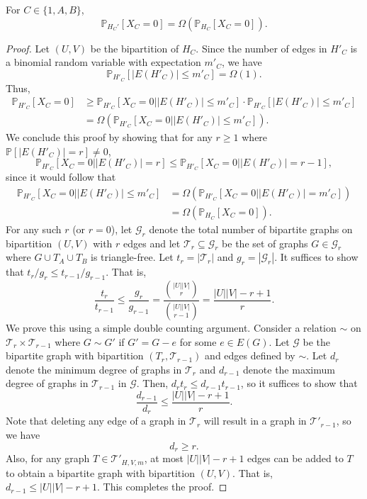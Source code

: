 \documentclass[10pt,a4paper]{amsart}
\def\P{\mathbb P}
\begin{document}
\begin{claim}\label{clm: m to p}
    For $C \in \{1,A,B\}$,
    \[
    \P_{H_C'}[X_C = 0] =\Omega(\P_{H_C}[X_C = 0]).
    \]
\end{claim}

\begin{proof}
    Let $(U,V)$ be the bipartition of $H_C$. Since the number of edges in $H'_C$ is a binomial random variable with expectation $m'_C$, we have 
    \[
    \P_{H'_C}[|E(H'_C)|\leq m'_C] = \Omega(1).
    \] 
    Thus, 
    \begin{align*}
        \P_{H'_C}[X_C = 0] &\geq \P_{H'_C}[X_C = 0 \mathrel ||E(H'_C)| \leq m'_C] \cdot\P_{H'_C}[|E(H'_C)| \leq m'_C]\\
        &= \Omega(\P_{H'_C}[X_C = 0 \mathrel ||E(H'_C)| \leq m'_C]).
    \end{align*}
We conclude this proof by showing that for any $r \geq 1$ where $\P[|E(H'_C)| = r] \neq 0$, 
    \[
        \P_{H'_C}[X_C = 0 \mathrel | |E(H'_C)| = r] \leq \P_{H'_C}[X_C = 0 \mathrel||E(H'_C)| = r-1],
    \]
    since it would follow that 
    \begin{align*}
        \P_{H'_C}[X_C = 0\mathrel | |E(H'_C)| \leq m'_C] &= \Omega(\P_{H'_C}[X_C = 0\mathrel | |E(H'_C)| = m'_C])\\
        &= \Omega(\P_{H_C}[X_C = 0]).
    \end{align*}
    For any such $r$ (or $r = 0$), let $\mathcal G_r$ denote the total number of bipartite graphs on bipartition $(U,V)$ with $r$ edges and let $\mathcal T_r \subseteq \mathcal G_r$ be the set of graphs $G \in \mathcal G_r$ where $G \cup T_A \cup T_B$ is triangle-free. Let $t_r = |\mathcal T_r|$ and $g_r = |\mathcal G_r|$. It suffices to show that $t_r/g_r \leq t_{r-1}/g_{r-1}$. That is,
    \[
    \frac{t_{r}}{t_{r-1}} \leq \frac{g_{r}}{g_{r-1}} = \frac{\binom{|U||V|}{r}}{\binom{|U||V|}{r-1}} = \frac{|U||V| - r + 1}{r}.
    \]
    We prove this using a simple double counting argument. Consider a relation $\sim $ on $\mathcal T_r \times \mathcal T_{r-1}$ where $G \sim G'$ if $G' = G -e$ for some $e \in E(G)$. Let $\mathscr G$ be the bipartite graph with bipartition $(T_{r} , \mathcal T_{r-1})$ and edges defined by $\sim$. Let $d_r$ denote the minimum degree of graphs in $\mathcal T_{r}$ and $d_{r-1}$ denote the maximum degree of graphs in $\mathcal T_{r-1}$ in $\mathscr G$. Then, $d_rt_r \leq d_{r-1}t_{r-1}$, so it suffices to show that 
    \[
    \frac{d_{r-1}}{d_{r}} \leq \frac{|U||V| - r+1}{r}.
    \]
    Note that deleting any edge of a graph in $\mathcal T_{r}$ will result in a graph in $\mathcal T'_{r-1}$, so we have 
    \[
    d_r \geq r.
    \]
    Also, for any graph $T \in \mathcal T'_{H, V, m}$, at most $|U||V| - r + 1$ edges can be added to $T$ to obtain a bipartite graph with bipartition $(U, V)$. That is,  $d_{r-1} \leq |U||V| - r+1$. This completes the proof.
\end{proof}
\end{document}
